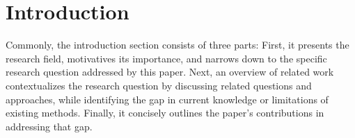 
\chapter{Introduction}
\label{ch:introduction}

Commonly, the introduction section consists of three parts:
First, it presents the research field, motivatives its importance, and narrows down to the specific research question addressed by this paper.
Next, an overview of related work contextualizes the research question by discussing related questions and approaches, while identifying the gap in current knowledge or limitations of existing methods.
Finally, it concisely outlines the paper's contributions in addressing that gap.















